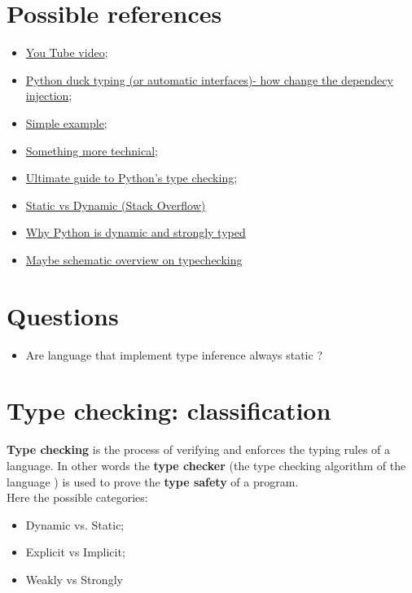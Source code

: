 \documentclass[12pt]{article}
\begin{document}
\maketitle
\tableofcontents
\listoftables
\listoffigures

\section{Possible references}
	\begin{itemize}
		\item \href{https://www.youtube.com/watch?v=fK5lcaNqdj4}{You Tube video};
		\item \href{https://hackernoon.com/python-duck-typing-or-automatic-interfaces-73988ec9037f}{Python duck typing (or automatic interfaces)- how change the dependecy injection};
		\item \href{https://medium.com/programming-hacks/duck-typing-in-python-6740aa72b301}{Simple example};
		\item \href{http://www.voidspace.org.uk/python/articles/duck_typing.shtml}{Something more technical};
		\item 
		\href{https://realpython.com/python-type-checking/}{Ultimate guide to Python's type checking;}
		\item
		\href{https://stackoverflow.com/questions/1517582/what-is-the-difference-between-statically-typed-and-dynamically-typed-languages}{Static vs Dynamic (Stack Overflow)}
		\item
		\href{https://wiki.python.org/moin/Why is Python a dynamic language and also a strongly typed language}{Why Python is dynamic and strongly typed}
		\item
		\href{https://android.jlelse.eu/magic-lies-here-statically-typed-vs-dynamically-typed-languages-d151c7f95e2b}{Maybe schematic overview on typechecking}
	\end{itemize}

\section{Questions}
	\begin{itemize}
		\item Are language that implement type inference always static ?
	\end{itemize}
\newpage
\section{Type checking: classification}
	\textbf{Type checking} is the process of verifying and enforces the typing rules of a language. In other words the \textbf{type checker} (the type checking algorithm of the language ) is used to prove the \textbf{type safety} of a program.\\
	Here the possible categories:
	\begin{itemize}
		\item Dynamic vs. Static;
		\item Explicit vs Implicit;
		\item Weakly vs Strongly
	\end{itemize}
\end{document}

